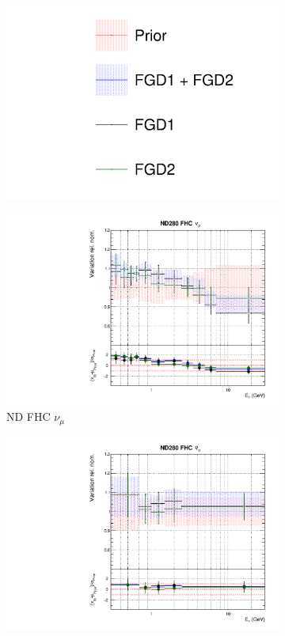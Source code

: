\begin{figure}
\centering
\begin{subfigure}{0.95\textwidth}
  \centering
  \includegraphics[width=0.24\linewidth]{figs/fgdfits_leg}
\end{subfigure}
\begin{subfigure}{0.24\textwidth}
  \centering
  \includegraphics[width=0.95\linewidth]{figs/fgdfitsflux_0}
  \caption{ND FHC $\nu_{\mu}$}  
\end{subfigure}
\begin{subfigure}{0.24\textwidth}
  \centering
  \includegraphics[width=0.95\linewidth]{figs/fgdfitsflux_1}

\end{subfigure}
\end{figure}
